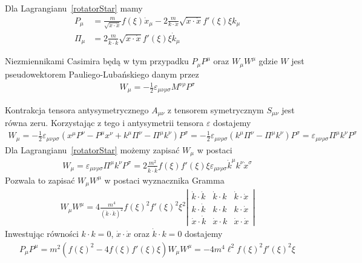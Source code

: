 Dla Lagrangianu~\ref{rotatorStar} mamy 
\begin{align}
P_\mu &=  \frac{m}{\sqrt{ \dot{x} \cdot \dot{x} }} f(\xi) \dot{x}_\mu 
- 2 \frac{m}{k \cdot \dot{x}} \sqrt{ \dot{x} \cdot \dot{x} }
f'(\xi) \xi k_\mu  \\
\Pi_\mu &= 2 \frac{m}{\dot{k} \cdot \dot{k}} \sqrt{ \dot{x} \cdot \dot{x} }
f'(\xi) \xi \dot{k}_\mu
\end{align}

Niezmiennikami Casimira będą w tym przypadku $P_\mu P^\mu$ oraz
$W_\mu W^\mu$ gdzie $W$ jest pseudowektorem Pauliego-Lubańskiego 
danym przez
\begin{align}
W_\mu = - \frac{1}{2} \varepsilon_{\mu\nu\rho\sigma}
M^{\nu\rho} P^\sigma
\end{align}

Kontrakcja tensora antysymetrycznego $A_{\mu\nu}$ z 
tensorem symetrycznym $S_{\mu\nu}$ jest równa zeru. 
Korzystając z tego i antysymetrii tensora $\varepsilon$ dostajemy
\begin{align}
W_\mu = - \frac{1}{2} \varepsilon_{\mu\nu\rho\sigma}
(x^\mu P^\nu - P^\mu x^\nu + k^\mu \Pi^\nu - \Pi^\mu k^\nu) P^\sigma = 
 - \frac{1}{2} \varepsilon_{\mu\nu\rho\sigma}
( k^\mu \Pi^\nu - \Pi^\mu k^\nu) P^\sigma = 
  \varepsilon_{\mu\nu\rho\sigma}
 \Pi^\mu k^\nu P^\sigma
\end{align}
Dla Lagrangianu~\ref{rotatorStar} możemy zapisać $W_\mu$ w postaci
\begin{align}
W_\mu =  \varepsilon_{\mu\nu\rho\sigma}  \Pi^\mu k^\nu P^\sigma =
2\frac{m^2}{ \dot{k} \cdot \dot{k}} 
f(\xi) f'(\xi) \xi \varepsilon_{\mu\nu\rho\sigma} 
 \dot{k}^\mu k^\nu \dot{x}^\sigma
\end{align}
Pozwala to zapisać $W_\mu W^\mu$ w postaci wyznacznika Gramma
\begin{align}
W_\mu W^\mu = 
4 \frac{m^4}{ (\dot{k} \cdot \dot{k})^2} 
f(\xi)^2 f'(\xi)^2 \xi^2 
\left| 
\begin{array}{ccc}
\dot{k} \cdot \dot{k}& \dot{k} \cdot k& \dot{k} \cdot \dot{x}\\
k \cdot \dot{k}& k \cdot k &k  \cdot \dot{x}\\
\dot{x} \cdot \dot{k}& \dot{x} \cdot k &\dot{x} \cdot \dot{x}
\end{array}
\right|
\end{align}
Inwestując równości $k\cdot k=0$, $\dot{x}\cdot\dot{x}$ 
oraz $\dot{k} \cdot k= 0$ dostajemy
\begin{align}
P_\mu P^\mu =  m^2( f(\xi)^2- 4 f(\xi) f'(\xi) \xi)
W_\mu W^\mu = 
 - 4 m^4\ell^2  f(\xi)^2 f'(\xi)^2 \xi
\end{align}
